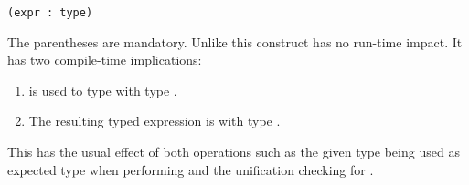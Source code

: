 \begin{lstlisting}
(expr : type)
\end{lstlisting}

The parentheses are mandatory. Unlike  this construct has no run-time impact. It has two compile-time implications:

\begin{enumerate}
\item {} is used to type  with type .
\item The resulting typed expression is  with type .
\end{enumerate}

This has the usual effect of both operations such as the given type being used as expected type when performing  and the unification checking for .
